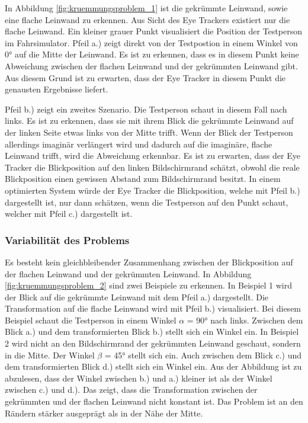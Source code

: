 In Abbildung \ref{fig:kruemmungsproblem_1} ist die gekrümmte Leinwand, sowie eine flache Leinwand zu erkennen. Aus Sicht des Eye Trackers existiert nur die flache Leinwand. Ein kleiner grauer Punkt visualisiert die Position der Testperson im Fahrsimulator. Pfeil a.) zeigt direkt von der Testpostion in einem Winkel von 0° auf die Mitte der Leinwand. Es ist zu erkennen, dass es in diesem Punkt keine Abweichung zwischen der flachen Leinwand und der gekrümmten Leinwand gibt. Aus diesem Grund ist zu erwarten, dass der Eye Tracker in diesem Punkt die genausten Ergebnisse liefert. 

Pfeil b.) zeigt ein zweites Szenario. Die Testperson schaut in diesem Fall nach links. Es ist zu erkennen, dass sie mit ihrem Blick die gekrümmte Leinwand auf der linken Seite etwas links von der Mitte trifft. Wenn der Blick der Testperson allerdings imaginär verlängert wird und dadurch auf die imaginäre, flache Leinwand trifft, wird die Abweichung erkennbar. Es ist zu erwarten, dass der Eye Tracker die Blickposition auf den linken Bildschirmrand schätzt, obwohl die reale Blickposition einen gewissen Abstand zum Bildschirmrand besitzt. In einem optimierten System würde der Eye Tracker die Blickposition, welche mit Pfeil b.) dargestellt ist, nur dann schätzen, wenn die Testperson auf den Punkt schaut, welcher mit Pfeil c.) dargestellt ist.


\subsubsection{Variabilität des Problems}

Es besteht kein gleichbleibender Zusammenhang zwischen der Blickposition auf der flachen Leinwand und der gekrümmten Leinwand. In Abbildung \ref{fig:kruemmungsproblem_2} sind zwei Beispiele zu erkennen. In Beispiel 1 wird der Blick auf die gekrümmte Leinwand mit dem Pfeil a.) dargestellt. Die Transformation auf die flache Leinwand wird mit Pfeil b.) visualisiert. Bei diesem Beispiel schaut die Testperson in einem Winkel $\alpha$ = 90° nach links. Zwischen dem Blick a.) und dem transformierten Blick b.) stellt sich ein Winkel ein. In Beispiel 2 wird nicht an den Bildschirmrand der gekrümmten Leinwand geschaut, sondern in die Mitte. Der Winkel $\beta$ = 45° stellt sich ein. Auch zwischen dem Blick c.) und dem transformierten Blick d.) stellt sich ein Winkel ein. Aus der Abbildung ist zu abzulesen, dass der Winkel zwischen b.) und a.) kleiner ist als der Winkel zwischen c.) und d.). Das zeigt, dass die Transformation zwischen der gekrümmten und der flachen Leinwand nicht konstant ist. Das Problem ist an den Rändern stärker ausgeprägt als in der Nähe der Mitte.

